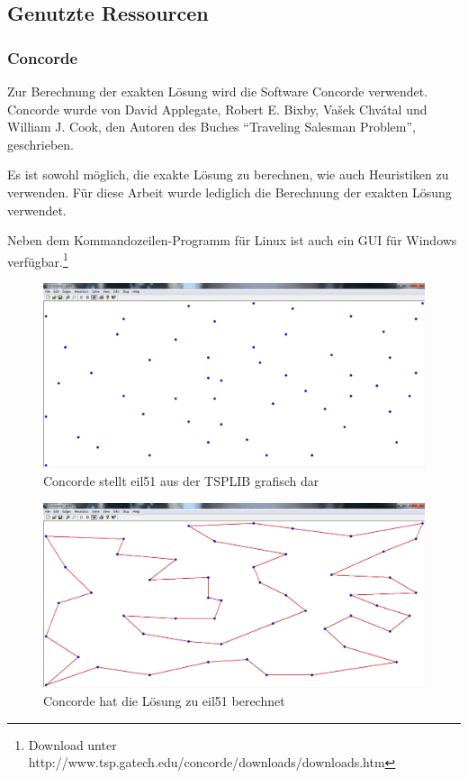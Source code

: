 \documentclass[11pt,a4paper]{article}
\begin{document}
\subsection{Genutzte Ressourcen}
\subsubsection{Concorde}
Zur Berechnung der exakten Lösung wird die Software Concorde verwendet. Concorde wurde von David Applegate, Robert E. Bixby, Vašek Chvátal und William J. Cook, den Autoren des Buches "`Traveling Salesman Problem"'\cite{applegate06}, geschrieben.

Es ist sowohl möglich, die exakte Lösung zu berechnen, wie auch Heuristiken zu verwenden. Für diese Arbeit wurde lediglich die Berechnung der exakten Lösung verwendet.

Neben dem Kommandozeilen-Programm für Linux ist auch ein GUI für Windows verfügbar.\footnote{Download unter http://www.tsp.gatech.edu/concorde/downloads/downloads.htm}

\begin{figure}[H]
        \centering
        \includegraphics[width=14cm]{gfx/concorde_cities}
        \caption{Concorde stellt eil51 aus der TSPLIB grafisch dar}
        \label{img:concorde_cities}
\end{figure}

\begin{figure}[H]
        \centering
        \includegraphics[width=14cm]{gfx/concorde_solution}
        \caption{Concorde hat die Lösung zu eil51 berechnet}
        \label{img:concorde_solution}
\end{figure}
\end{document}
